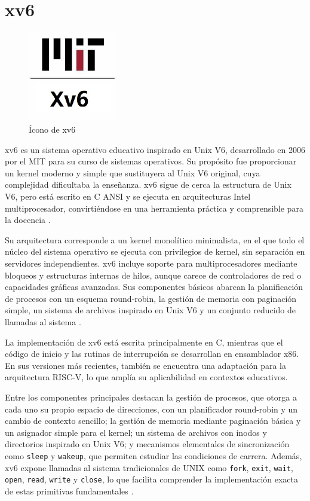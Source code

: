 \section{xv6}

\begin{figure}[H]
    \centering
    \includegraphics[width=0.35\textwidth]{figures/xv6.jpeg}
    \caption[Ícono de xv6]%
            {Ícono de xv6 \citep{pdos2016}}
    \label{fig:xv6}
\end{figure}

xv6 es un sistema operativo educativo inspirado en Unix V6, desarrollado en 2006 por el MIT para su curso de sistemas operativos. Su propósito fue proporcionar un kernel moderno y simple que sustituyera al Unix V6 original, cuya complejidad dificultaba la enseñanza. xv6 sigue de cerca la estructura de Unix V6, pero está escrito en C ANSI y se ejecuta en arquitecturas Intel multiprocesador, convirtiéndose en una herramienta práctica y comprensible para la docencia \citep{pdos2016}.  

Su arquitectura corresponde a un kernel monolítico minimalista, en el que todo el núcleo del sistema operativo se ejecuta con privilegios de kernel, sin separación en servidores independientes. xv6 incluye soporte para multiprocesadores mediante bloqueos y estructuras internas de hilos, aunque carece de controladores de red o capacidades gráficas avanzadas. Sus componentes básicos abarcan la planificación de procesos con un esquema round-robin, la gestión de memoria con paginación simple, un sistema de archivos inspirado en Unix V6 y un conjunto reducido de llamadas al sistema \citep[pp.~25]{mit2022}.  

La implementación de xv6 está escrita principalmente en C, mientras que el código de inicio y las rutinas de interrupción se desarrollan en ensamblador x86. En sus versiones más recientes, también se encuentra una adaptación para la arquitectura RISC-V, lo que amplía su aplicabilidad en contextos educativos.  

Entre los componentes principales destacan la gestión de procesos, que otorga a cada uno su propio espacio de direcciones, con un planificador round-robin y un cambio de contexto sencillo; la gestión de memoria mediante paginación básica y un asignador simple para el kernel; un sistema de archivos con inodos y directorios inspirado en Unix V6; y mecanismos elementales de sincronización como \texttt{sleep} y \texttt{wakeup}, que permiten estudiar las condiciones de carrera. Además, xv6 expone llamadas al sistema tradicionales de UNIX como \texttt{fork}, \texttt{exit}, \texttt{wait}, \texttt{open}, \texttt{read}, \texttt{write} y \texttt{close}, lo que facilita comprender la implementación exacta de estas primitivas fundamentales \citep[pp.~26--30]{mit2022}.  

